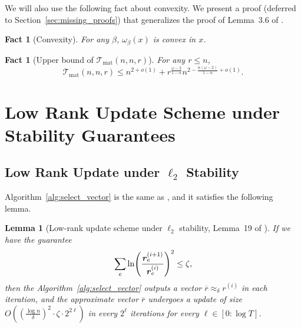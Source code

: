 \documentclass[11pt]{article}
\newtheorem{lemma}[theorem]{Lemma}
\newtheorem{fact}[theorem]{Fact}
\newcommand{\Tmat}{\mathcal{T}_{\mathrm{mat}}}
\let\originalleft\left
\let\originalright\right
\renewcommand{\left}{\mathopen{}\mathclose\bgroup\originalleft}
\renewcommand{\right}{\aftergroup\egroup\originalright}
\newcommand\rr{\boldsymbol{\mathit{r}}}
\newcommand{\ov}{\overline}
\begin{document}
We will also use the following fact about convexity. We present a proof (deferred to Section~\ref{sec:missing_proofs}) that generalizes the proof of Lemma~3.6 of \cite{jklps20}.
\begin{fact}[Convexity]\label{fact:FMM_convex}
For any $\beta$, $\omega_{\beta}(x)$ is convex in $x$.
\end{fact}

\begin{fact}[Upper bound of $\Tmat(n,n,r)$]\label{fact:upper_bound_Tmat}
For any $r \leq n$, 
\[
\Tmat(n,n,r) \leq n^{2+o(1)} + r^{\frac{\omega-2}{1-\alpha}} n^{2-\frac{\alpha (\omega-2)}{1-\alpha} + o(1)}.
\]
\end{fact}
 \section{Low Rank Update Scheme under Stability Guarantees}\label{sec:low_rank}

\subsection{Low Rank Update under \texorpdfstring{$\ell_2$}{} Stability}
Algorithm~\ref{alg:select_vector} is the same as \cite{lee2021tutorial}, and it satisfies the following lemma.
\begin{lemma}[Low-rank update scheme under $\ell_2$ stability, Lemma~19 of \cite{lee2021tutorial}]\label{lem:LowRankL2}
If we have the guarantee
\[
\sum_{e} \ln\left(\frac{\rr_e^{\left(i + 1\right)}}{\rr_e^{\left(i \right)}} \right)^2 \leq \zeta,
\]
then the Algorithm~\ref{alg:select_vector} outputs a vector $\ov{\rr} \approx_{\delta} \rr^{(i)}$ in each iteration, and the approximate vector $\ov{\rr}$ undergoes a update of size $O((\frac{\log n}{\delta})^2 \cdot \zeta \cdot 2^{2\ell})$ in every $2^\ell$ iterations for every $\ell \in [0:\log T]$.
\end{lemma}
\end{document}
